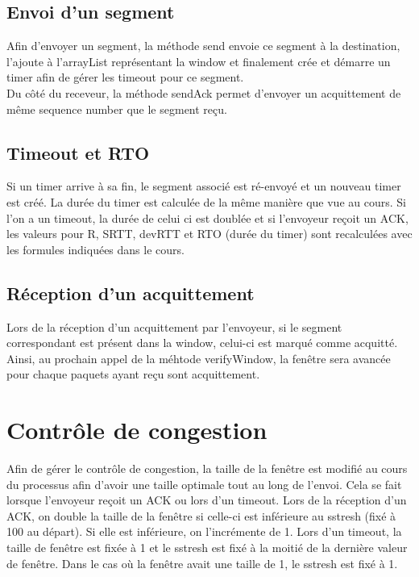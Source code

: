 \documentclass{article}
\begin{document}
\subsection{Envoi d'un segment}

Afin d'envoyer un segment, la méthode send envoie ce segment à la destination, l'ajoute à l'arrayList représentant la window et finalement crée et démarre un timer afin de gérer les timeout pour ce segment.\\
Du côté du receveur, la méthode sendAck permet d'envoyer un acquittement de même sequence number que le segment reçu.

\subsection{Timeout et RTO}

Si un timer arrive à sa fin, le segment associé est ré-envoyé et un nouveau timer est créé. 
La durée du timer est calculée de la même manière que vue au cours.
Si l'on a un timeout, la durée de celui ci est doublée et si l'envoyeur reçoit un ACK, les valeurs pour R, SRTT, devRTT et RTO (durée du timer) sont recalculées avec les formules indiquées dans le cours.

\subsection{Réception d'un acquittement}

Lors de la réception d'un acquittement par l'envoyeur, si le segment correspondant est présent dans la window, celui-ci est marqué comme acquitté.
Ainsi, au prochain appel de la méhtode verifyWindow, la fenêtre sera avancée pour chaque paquets ayant reçu sont acquittement. 

\section{Contrôle de congestion}

Afin de gérer le contrôle de congestion, la taille de la fenêtre est modifié au cours du processus afin d'avoir une taille optimale tout au long de l'envoi.
Cela se fait lorsque l'envoyeur reçoit un ACK ou lors d'un timeout.
Lors de la réception d'un ACK, on double la taille de la fenêtre si celle-ci est inférieure au sstresh (fixé à 100 au départ). Si elle est inférieure, on l'incrémente de 1.
Lors d'un timeout, la taille de fenêtre est fixée à 1 et le sstresh est fixé à la moitié de la dernière valeur de fenêtre. Dans le cas où la fenêtre avait une taille de 1, le sstresh est fixé à 1.
\end{document}

